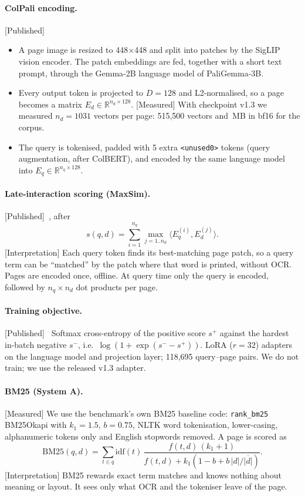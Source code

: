 \documentclass[11pt,a4paper]{article}
\newcommand{\lbl}[2]{\textsf{\scriptsize\textcolor{#1}{[#2]}}}
\newcommand{\Pub}{\lbl{tagP}{Published}}
\newcommand{\Int}{\lbl{tagI}{Interpretation}}
\newcommand{\Mea}{\lbl{tagM}{Measured}}
\begin{document}
\paragraph{ColPali encoding.} \Pub{}~\cite[\S2.2, \S4.1]{colpali}
\begin{itemize}
  \item A page image is resized to 448$\times$448 and split into patches by the SigLIP vision encoder. The patch embeddings are fed, together with a short text prompt, through the Gemma-2B language model of PaliGemma-3B.
  \item Every output token is projected to $D = 128$ and L2-normalised, so a page becomes a matrix $E_d \in \mathbb{R}^{n_d \times 128}$. \Mea{} With checkpoint v1.3 we measured $n_d = 1031$ vectors per page: 515,500 vectors and \sizeB{}\,MB in bf16 for the corpus.
  \item The query is tokenised, padded with 5 extra \texttt{<unused0>} tokens (query augmentation, after ColBERT), and encoded by the same language model into $E_q \in \mathbb{R}^{n_q \times 128}$.
\end{itemize}

\paragraph{Late-interaction scoring (MaxSim).} \Pub{}~\cite[Eq.~1]{colpali}, after~\cite[Eq.~3]{colbert}
\begin{equation}
  s(q,d) = \sum_{i=1}^{n_q} \max_{j=1..n_d} \langle E_q^{(i)}, E_d^{(j)} \rangle .
\end{equation}
\Int{} Each query token finds its best-matching page patch, so a query term can be ``matched'' by the patch where that word is printed, without OCR. Pages are encoded once, offline. At query time only the query is encoded, followed by $n_q \times n_d$ dot products per page.

\paragraph{Training objective.} \Pub{}~\cite[Eq.~2]{colpali} Softmax cross-entropy of the positive score $s^+$ against the hardest in-batch negative $s^-$, i.e.\ $\log(1+\exp(s^- - s^+))$. LoRA ($r=32$) adapters on the language model and projection layer; 118,695 query--page pairs. We do not train; we use the released v1.3 adapter.

\paragraph{BM25 (System A).} \Mea{} We use the benchmark's own BM25 baseline code: \texttt{rank\_bm25} BM25Okapi with $k_1=1.5$, $b=0.75$, NLTK word tokenisation, lower-casing, alphanumeric tokens only and English stopwords removed. A page is scored as
\begin{equation}
  \mathrm{BM25}(q,d) = \sum_{t\in q} \mathrm{idf}(t)\,\frac{f(t,d)\,(k_1+1)}{f(t,d)+k_1\left(1-b+b\,|d|/\overline{|d|}\right)} .
\end{equation}
\Int{} BM25 rewards exact term matches and knows nothing about meaning or layout. It sees only what OCR and the tokeniser leave of the page.
\end{document}
